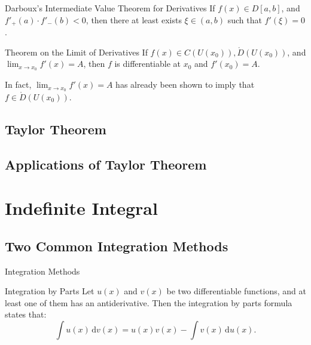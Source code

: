 \documentclass[11pt]{../../TexTemplate/elegantbook}
\begin{document}
\begin{theorem}{Darboux's Intermediate Value Theorem for Derivatives}
    If \(f(x)\in D[a,b]\), and \(f'_{+}(a)\cdot f'_{-}(b)<0\),
    then there at least exists \(\xi\in (a,b)\) such that \(f'(\xi) = 0\).
\end{theorem}

\begin{theorem}{Theorem on the Limit of Derivatives}
    If \(f(x)\in C(U(x_{0})),\mathring{D}(U(x_{0}))\), and \(\lim_{x \to x_{0}} f'(x) = A\),
    then \(f\) is differentiable at \(x_{0}\) and \(f'(x_{0}) = A\).
\end{theorem}
\begin{remark}
    In fact, \(\lim_{x \to x_{0}} f'(x) = A\) has already been shown to imply that \(f\in \mathring{D}(U(x_{0}))\).
\end{remark}

\section{Taylor Theorem}

\section{Applications of Taylor Theorem}

\chapter{Indefinite Integral}

\section{Two Common Integration Methods}
\begin{leftbarTitle}{Integration Methods}\end{leftbarTitle}
\begin{definition}{Integration by Parts}
    Let \( u(x) \) and \( v(x) \) be two differentiable functions,
    and at least one of them has an antiderivative.
    Then the integration by parts formula states that:
    \[
        \int u(x) \, \mathrm{d}v(x) = u(x)v(x) - \int v(x) \, \mathrm{d}u(x).
    \]
\end{definition}
\end{document}
